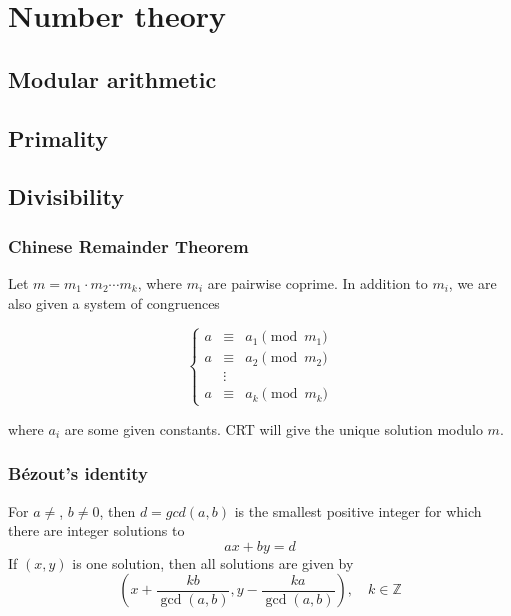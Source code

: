 \chapter{Number theory}

\section{Modular arithmetic}

\section{Primality}

\section{Divisibility}
  \subsection{Chinese Remainder Theorem}
  Let $m = m_1 \cdot m_2 \cdots m_k$, where $m_i$ are pairwise coprime. In addition to $m_i$, we are also given a system of congruences

$$\left\{\begin{array}{rcl}
    a & \equiv & a_1 \pmod{m_1} \\
    a & \equiv & a_2 \pmod{m_2} \\
      & \vdots & \\
    a & \equiv & a_k \pmod{m_k}
\end{array}\right.$$

where $a_i$ are some given constants. CRT will give the unique solution modulo $m$.

	\subsection{Bézout's identity}
	For $a \neq $, $b \neq 0$, then $d=gcd(a,b)$ is the smallest positive integer for which there are integer solutions to
	$$ax+by=d$$
	If $(x,y)$ is one solution, then all solutions are given by
	$$\left(x+\frac{kb}{\gcd(a,b)}, y-\frac{ka}{\gcd(a,b)}\right), \quad k\in\mathbb{Z}$$

